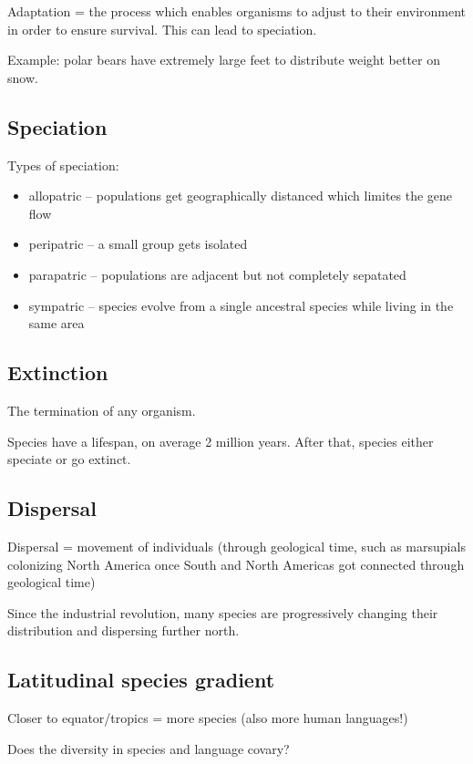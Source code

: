 Adaptation = the process which enables organisms to adjust to their
environment in order to ensure survival. This can lead to speciation.

Example: polar bears have extremely large feet to distribute weight better
on snow.

\subsection{Speciation}

Types of speciation:
\begin{itemize}
	\item allopatric -- populations get geographically distanced which
		limites the gene flow
	\item peripatric -- a small group gets isolated
	\item parapatric -- populations are adjacent but not completely
		sepatated
	\item sympatric -- species evolve from a single ancestral species
		while living in the same area
\end{itemize}

\subsection{Extinction}

The termination of any organism.

Species have a lifespan, on average 2 million years. After that, species either
speciate or go extinct.

\subsection{Dispersal}

Dispersal = movement of individuals (through geological time, such as
marsupials colonizing North America once South and North Americas got connected
through geological time)

Since the industrial revolution, many species are progressively changing their
distribution and dispersing further north.

\subsection{Latitudinal species gradient}

Closer to equator/tropics = more species (also more human languages!)

Does the diversity in species and language covary?

